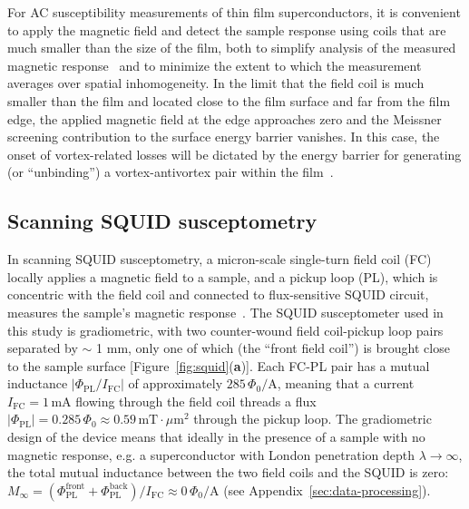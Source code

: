 \documentclass[%
 reprint,
 superscriptaddress,
 amsmath,
 amssymb,
 amsfonts,
 aps,
 prb,
]{revtex4-2}
\newcommand{\FC}{\mathrm{FC}}
\newcommand{\PL}{\mathrm{PL}}
\newcommand{\um}{\mu\mathrm{m}}
\begin{document}
For AC susceptibility measurements of thin film superconductors, it is convenient to apply the magnetic field and detect the sample response using coils that are much smaller than the size of the film, both to simplify analysis of the measured magnetic response~\cite{Jeanneret1989-ss, Turneaure1996-ns, Turneaure1998-mo, He2016-pz} and to minimize the extent to which the measurement averages over spatial inhomogeneity. In the limit that the field coil is much smaller than the film and located close to the film surface and far from the film edge, the applied magnetic field at the edge approaches zero and the Meissner screening contribution to the surface energy barrier vanishes. In this case, the onset of vortex-related losses will be dictated by the energy barrier for generating (or ``unbinding'') a vortex-antivortex pair within the film~\cite{Lemberger2016-pb}.


\subsection{Scanning SQUID susceptometry}
\label{sec:susceptometry}

In scanning SQUID susceptometry, a micron-scale single-turn field coil (FC) locally applies a magnetic field to a sample, and a pickup loop (PL), which is concentric with the field coil and connected to flux-sensitive SQUID circuit, measures the sample's magnetic response~\cite{Gardner2001-gr, Huber2008-il, Kirtley2016-zz}. The SQUID susceptometer used in this study is gradiometric, with two counter-wound field coil-pickup loop pairs separated by $\sim$ 1 mm, only one of which (the ``front field coil'') is brought close to the sample surface [Figure~\ref{fig:squid}({\bf a})]. Each FC-PL pair has a mutual inductance $|\Phi_\PL/I_\FC|$ of approximately $285\,\Phi_0/\mathrm{A}$, meaning that a current $I_\FC=1\,\mathrm{mA}$ flowing through the field coil threads a flux $|\Phi_\PL|=0.285\,\Phi_0\approx0.59\,\mathrm{mT}\cdot\um^2$ through the pickup loop. The gradiometric design of the device means that ideally in the presence of a sample with no magnetic response, e.g. a superconductor with London penetration depth $\lambda\to\infty$, the total mutual inductance between the two field coils and the SQUID is zero: $M_\infty = (\Phi^\mathrm{front}_\PL + \Phi^\mathrm{back}_\PL)/I_\FC \approx 0\,\Phi_0/\mathrm{A}$ (see Appendix~\ref{sec:data-processing}).
\end{document}
